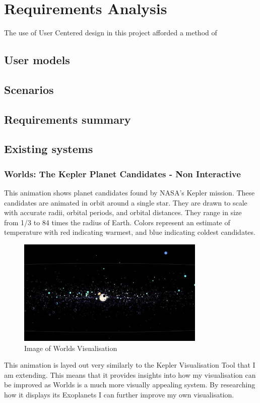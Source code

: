\chapter{Requirements Analysis}\label{C:ra}
The use of User Centered design in this project afforded a method of
\section{User models}

\section{Scenarios}

\section{Requirements summary}

\section{Existing systems}
\subsection{Worlds: The Kepler Planet Candidates - Non Interactive}
 This animation \cite{worlds} shows  planet candidates found by NASA's Kepler mission. These candidates are animated in orbit around a single star. They are drawn to scale with accurate radii, orbital periods, and orbital distances. They range in size from 1/3 to 84 times the radius of Earth. Colors represent an estimate of temperature with red indicating warmest, and blue indicating coldest candidates. 
\begin{figure}[h!]
  \centering
      \includegraphics[width=0.8\textwidth]{images/worlds.jpg}
  \caption{Image of Worlds Visualisation}
\end{figure}
This animation is layed out very similarly to the Kepler Visualisation Tool that I am extending. This means that it provides insights into how my visualisation can be improved as Worlds is a much more visually appealing system. By researching how it displays its Exoplanets I can further improve my own visualisation.

